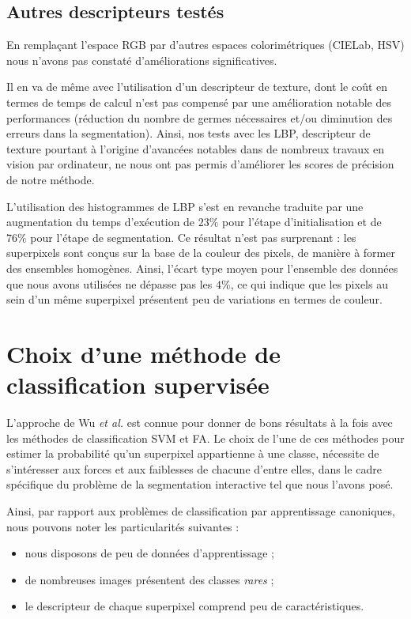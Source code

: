 \subsection{Autres descripteurs testés }

En remplaçant  l'espace RGB par d'autres espaces colorimétriques (CIELab, HSV) nous n'avons pas constaté d'améliorations significatives. 

Il en va de même avec l'utilisation d'un descripteur de texture, dont le coût en termes de temps de calcul n'est pas compensé par une amélioration notable des performances (réduction du nombre de germes nécessaires et/ou diminution des erreurs dans la segmentation). Ainsi, nos tests avec les LBP, descripteur de texture pourtant à l'origine d'avancées notables dans de nombreux travaux en vision par ordinateur, ne nous ont pas permis d'améliorer les scores de précision de notre méthode.

L'utilisation des histogrammes de LBP s'est en revanche traduite par une augmentation du temps d'exécution de $23\%$ pour l'étape d'initialisation et de $76\%$ pour l'étape de segmentation. Ce résultat n'est  pas surprenant : les superpixels sont conçus sur la base de la couleur des pixels, de manière à former des ensembles homogènes. Ainsi, l'écart type moyen pour l'ensemble des données que nous avons utilisées ne dépasse pas les $4\%$, ce qui indique que les pixels au sein d'un même superpixel présentent peu de variations en termes de couleur.


\section{Choix d'une méthode de classification supervisée}
\label{sec:saf:SelectClassifSup}

L'approche de Wu \textit{et al.} \cite{wu2004probability}  est connue pour donner de bons résultats à la fois avec les méthodes de classification  SVM et  FA. Le choix de l'une de ces méthodes pour estimer la  probabilité qu'un superpixel appartienne à une classe, nécessite de s'intéresser aux forces et aux faiblesses de chacune d'entre elles, dans le cadre spécifique du problème de la segmentation interactive tel que nous l'avons posé. 

Ainsi, par rapport aux problèmes de classification par apprentissage canoniques, nous pouvons noter les particularités suivantes :
\begin{itemize}
\item nous disposons de peu de données d’apprentissage ;
\item de nombreuses images présentent des classes \emph{rares} ;
\item le descripteur  de chaque superpixel comprend peu de caractéristiques. 
\end{itemize}

